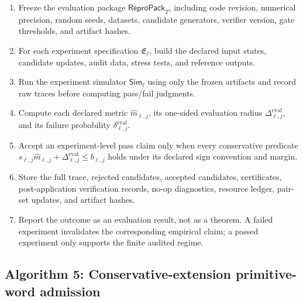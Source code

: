 \documentclass[11pt,a4paper]{article}
\newcommand{\eval}{\mathrm{eval}}
\begin{document}
\begin{enumerate}[label=\textbf{E\arabic*.}, leftmargin=2em]
    \item Freeze the evaluation package \(\mathsf{ReproPack}_T\), including code revision, numerical precision, random seeds, datasets, candidate generators, verifier version, gate thresholds, and artifact hashes.
    \item For each experiment specification \(\mathfrak E_\ell\), build the declared input states, candidate updates, audit data, stress tests, and reference outputs.
    \item Run the experiment simulator \(\mathsf{Sim}_\ell\) using only the frozen artifacts and record raw traces before computing pass/fail judgments.
    \item Compute each declared metric \(\widehat m_{\ell,j}\), its one-sided evaluation radius \(\Delta_{\ell,j}^{\eval}\), and its failure probability \(\delta_{\ell,j}^{\eval}\).
    \item Accept an experiment-level pass claim only when every conservative predicate \(s_{\ell,j}\widehat m_{\ell,j}+\Delta_{\ell,j}^{\eval}\le b_{\ell,j}\) holds under its declared sign convention and margin.
    \item Store the full trace, rejected candidates, accepted candidates, certificates, post-application verification records, no-op diagnostics, resource ledger, pair-set updates, and artifact hashes.
    \item Report the outcome as an evaluation result, not as a theorem.  A failed experiment invalidates the corresponding empirical claim; a passed experiment only supports the finite audited regime.
\end{enumerate}


\subsection{Algorithm 5: Conservative-extension primitive-word admission}
\end{document}
